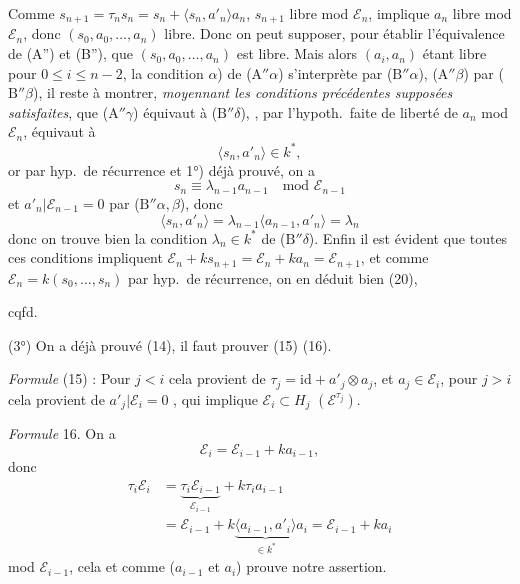 \documentclass[11pt,a4paper]{article}
\begin{document}
Comme $s_{n+1} = \tau_n s_n = s_n + \langle s_n, a'_n \rangle a_n$,  $s_{n+1}$ libre mod $\mathcal{E}_n$, implique $a_n$ libre mod $\mathcal{E}_n$, donc $(s_0, a_0, \dots, a_n)$ libre.
Donc on peut supposer, pour établir l'équivalence de (A'') et (B''), que $(s_0, a_0, \dots, a_n)$ est libre. Mais alors $(a_i, a_n)$ étant libre pour $0 \leq i \leq n-2$, la condition $\alpha$) de ($\mathrm{A}''\alpha$) s'interprète par ($\mathrm{B}''\alpha$), ($\mathrm{A}''\beta$) par ($\mathrm{B}''\beta$), il reste à montrer, \emph{moyennant les conditions précédentes supposées satisfaites}, que ($\mathrm{A}''\gamma$) équivaut à ($\mathrm{B}''\delta$),  , par l'hypoth.\ faite de liberté de $a_n$ mod $\mathcal{E}_n$, équivaut à
\[
\langle s_n, a'_n \rangle \in k^* ,
\]
or par hyp.\ de récurrence et 1°) déjà prouvé, on a
\[
s_n \equiv \lambda_{n-1} a_{n-1} \quad \text{mod } \mathcal{E}_{n-1}
\]
et $a'_n | \mathcal{E}_{n-1} = 0$ par ($\mathrm{B}''\alpha, \beta$), donc
\[
\langle s_n, a'_n \rangle = \lambda_{n-1} \langle a_{n-1}, a'_n \rangle = \lambda_n
\]
donc on trouve bien la condition $\lambda_n \in k^*$ de ($\mathrm{B}''\delta$). Enfin il est évident que toutes ces conditions impliquent $\mathcal{E}_n + k s_{n+1} = \mathcal{E}_n + k a_n = \mathcal{E}_{n+1}$, et comme $\mathcal{E}_n = k(s_0, \dots, s_n)$ par hyp.\ de récurrence, on en déduit bien (20),

cqfd.

(3°) On a déjà prouvé (14), il faut prouver (15) (16).

\emph{Formule} (15) : Pour $j < i$ cela provient de $\tau_j = \mathrm{id} + a'_j \otimes a_j$, et $a_j \in \mathcal{E}_i$, pour $j > i$ cela provient de $a'_j | \mathcal{E}_i = 0$ , qui implique $\mathcal{E}_i \subset H_j$ $(\mathcal{E}^{\tau_j})$.

\emph{Formule} 16. On a
\[
\mathcal{E}_i = \mathcal{E}_{i-1} + k a_{i-1} ,
\]
donc
\[
\begin{aligned}
\tau_i \mathcal{E}_i &= \underbrace{\tau_i \mathcal{E}_{i-1}}_{\mathcal{E}_{i-1}} + k \tau_i a_{i-1} \\
&= \mathcal{E}_{i-1} + k \underbrace{\langle a_{i-1}, a'_i \rangle}_{\in k^*} a_i = \mathcal{E}_{i-1} + k a_i
\end{aligned}
\]
 mod $\mathcal{E}_{i-1}$, cela et comme ($a_{i-1}$ et $a_i$) \struck{\ill{}} prouve notre assertion.
\end{document}
